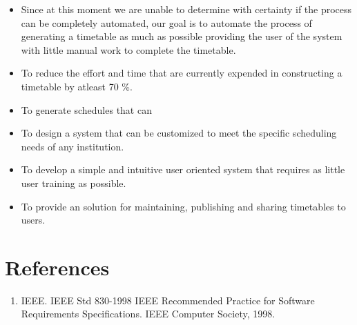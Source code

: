 \documentclass{scrreprt}
\begin{document}
\begin{itemize}
 \item Since at this moment we are unable to determine with certainty if the process can be completely automated, our goal is to automate the process of generating a timetable as much as possible providing the user of the system with little manual work to complete the timetable.
 \item  To reduce the effort and time that are currently expended in constructing a timetable by atleast 70 \%.
 \item To generate schedules that can 
 \item To design a system that can be customized to meet the specific scheduling needs of any institution.
 \item To develop a simple and intuitive user oriented system that requires as little user training as possible.
 \item To provide an solution for maintaining, publishing and sharing timetables to users.
\end{itemize} 
   
 

\section{References}
\begin{enumerate}
 \item IEEE. IEEE Std 830-1998 IEEE Recommended Practice for Software Requirements Specifications. IEEE Computer Society, 1998.
\end{enumerate}

\end{document}
